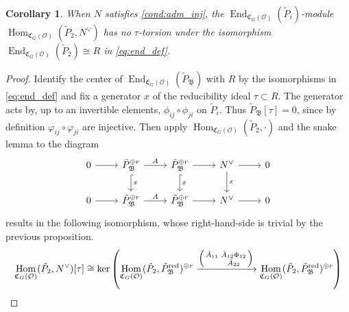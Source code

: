 \documentclass[leqno]{amsart}
\newcommand{\smat}[1]{\left( \begin{smallmatrix} #1 \end{smallmatrix} \right)}
\newcommand{\B}{\mathfrak B}
\newcommand{\fC}{\mathfrak C}
\newcommand{\red}{\textnormal{red}}
\newcommand{\oo}{\mathcal{O}} %
\DeclareMathOperator{\End}{End}
\DeclareMathOperator{\Hom}{Hom}
\newtheorem{cor}[thm]{Corollary}
\theoremstyle{definition}
\theoremstyle{remark}
\begin{document}
\begin{cor}
	When $N$ satisfies \eqref{cond:adm_inj},
	the $\End_{\fC_{G}(\oo)}(\tilde{P}_i)$-module
	$\Hom_{\fC_G(\oo)}(\tilde{P}_2, N^\vee)$
	has no $\tau$-torsion 
	under the isomorphism $\End_{\fC_{G}(\oo)}(\tilde{P}_2)\cong R$
	in \eqref{eq:end_def}.
\end{cor}
\begin{proof}
	Identify the center of $\End_{\fC_{G}(\oo)}(\tilde{P}_\B)$ 
	with $R$ by the isomorphisms
	in \eqref{eq:end_def}
	and fix a generator $x$ of the reducibility ideal  $\tau\subset R$.
	The generator acts by, up to an invertible elements,
	$\phi_{ij}\circ\phi_{ji}$ on $\tilde{P}_i$.
	Thus $\tilde{P}_\B[\tau]=0$,
	since by definition $\varphi_{ij}\circ\varphi_{ji}$ are injective.
	Then apply 
	$\Hom_{\fC_G(\oo)}(\tilde{P}_2,\cdot)$
	and the snake lemma to the diagram
    \begin{equation*}
    \begin{tikzcd}
        0 \arrow[r] & \tilde{P}_\B^{\oplus r} 
	\arrow[d,"x",hookrightarrow] \arrow[r,"A"] & 
	\tilde{P}_\B^{\oplus r} 
	\arrow[d,"x",hookrightarrow] \arrow[r] & 
	N^\vee \arrow[d,"x"] \arrow[r] & 0 \\ 
        0 \arrow[r] & \tilde{P}_\B^{\oplus r}
	\arrow[r,"A"] & \tilde{P}_\B^{\oplus r}
	\arrow[r] &N^\vee  \arrow[r] & 0 
    \end{tikzcd}
\end{equation*}
results in the following isomorphism,
whose right-hand-side
is trivial by the previous proposition.
\[
\Hom_{\fC_G(\oo)}(\tilde{P}_2, N^\vee)[\tau]\cong 
\ker\left(
	\Hom_{\fC_G(\oo)}(\tilde{P}_2, \tilde{P}_\B^{\red})^{\oplus r}
\xrightarrow{\smat{\bar{A}_{11}& \bar{A}_{12}\Phi_{12}\\& \bar{A}_{22}}}
\Hom_{\fC_G(\oo)}(\tilde{P}_2, \tilde{P}_\B^{\red})^{\oplus r} \right)
\]\qedhere
\end{proof}
\end{document}
